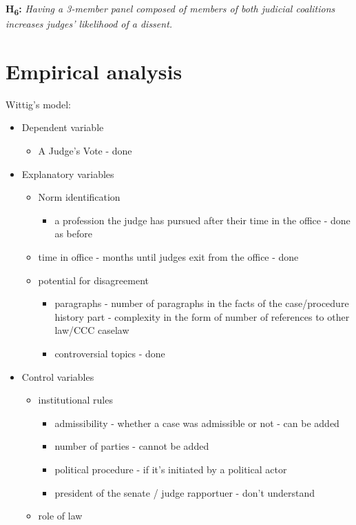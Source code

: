 \documentclass[
  11pt,
]{article}
\providecommand{\tightlist}{%
  \setlength{\itemsep}{0pt}\setlength{\parskip}{0pt}}
\begin{document}
\textbf{H\textsubscript{6}:} \emph{Having a 3-member panel composed of
members of both judicial coalitions increases judges' likelihood of a
dissent.}

\hypertarget{empirical-analysis}{%
\section{Empirical analysis}\label{empirical-analysis}}

Wittig's model:

\begin{itemize}
\tightlist
\item
  Dependent variable

  \begin{itemize}
  \tightlist
  \item
    A Judge's Vote - done
  \end{itemize}
\item
  Explanatory variables

  \begin{itemize}
  \tightlist
  \item
    Norm identification

    \begin{itemize}
    \tightlist
    \item
      a profession the judge has pursued after their time in the office
      - done as before
    \end{itemize}
  \item
    time in office - months until judges exit from the office - done
  \item
    potential for disagreement

    \begin{itemize}
    \tightlist
    \item
      paragraphs - number of paragraphs in the facts of the
      case/procedure history part - complexity in the form of number of
      references to other law/CCC caselaw
    \item
      controversial topics - done
    \end{itemize}
  \end{itemize}
\item
  Control variables

  \begin{itemize}
  \tightlist
  \item
    institutional rules

    \begin{itemize}
    \tightlist
    \item
      admissibility - whether a case was admissible or not - can be
      added
    \item
      number of parties - cannot be added
    \item
      political procedure - if it's initiated by a political actor
    \item
      president of the senate / judge rapportuer - don't understand
    \end{itemize}
  \item
    role of law


\end{itemize}
\end{itemize}
\end{document}
